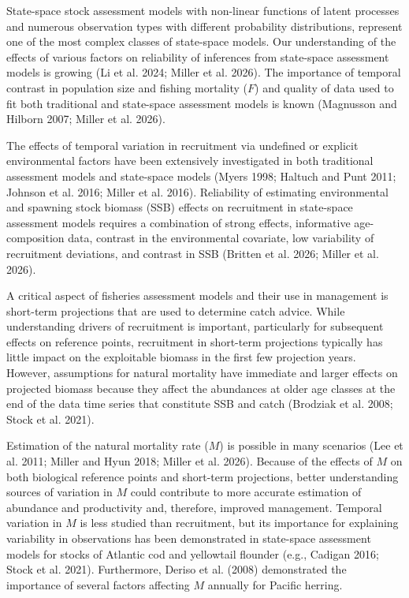 \documentclass[
  12pt,
]{article}
\begin{document}
State-space stock assessment models with non-linear functions of latent
processes and numerous observation types with different probability
distributions, represent one of the most complex classes of state-space
models. Our understanding of the effects of various factors on
reliability of inferences from state-space assessment models is growing
(Li et al. 2024; Miller et al. 2026). The importance of temporal
contrast in population size and fishing mortality (\(F\)) and quality of
data used to fit both traditional and state-space assessment models is
known (Magnusson and Hilborn 2007; Miller et al. 2026).

The effects of temporal variation in recruitment via undefined or
explicit environmental factors have been extensively investigated in
both traditional assessment models and state-space models (Myers 1998;
Haltuch and Punt 2011; Johnson et al. 2016; Miller et al. 2016).
Reliability of estimating environmental and spawning stock biomass (SSB)
effects on recruitment in state-space assessment models requires a
combination of strong effects, informative age-composition data,
contrast in the environmental covariate, low variability of recruitment
deviations, and contrast in SSB (Britten et al. 2026; Miller et al.
2026).

A critical aspect of fisheries assessment models and their use in
management is short-term projections that are used to determine catch
advice. While understanding drivers of recruitment is important,
particularly for subsequent effects on reference points, recruitment in
short-term projections typically has little impact on the exploitable
biomass in the first few projection years. However, assumptions for
natural mortality have immediate and larger effects on projected biomass
because they affect the abundances at older age classes at the end of
the data time series that constitute SSB and catch (Brodziak et al.
2008; Stock et al. 2021).

Estimation of the natural mortality rate (\(M\)) is possible in many
scenarios (Lee et al. 2011; Miller and Hyun 2018; Miller et al. 2026).
Because of the effects of \(M\) on both biological reference points and
short-term projections, better understanding sources of variation in
\(M\) could contribute to more accurate estimation of abundance and
productivity and, therefore, improved management. Temporal variation in
\(M\) is less studied than recruitment, but its importance for
explaining variability in observations has been demonstrated in
state-space assessment models for stocks of Atlantic cod and yellowtail
flounder (e.g., Cadigan 2016; Stock et al. 2021). Furthermore, Deriso et
al. (2008) demonstrated the importance of several factors affecting
\(M\) annually for Pacific herring.
\end{document}
